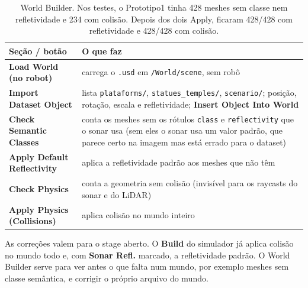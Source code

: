 \documentclass[10pt,a4paper]{article}
\newcommand{\arq}[1]{\texttt{#1}}
\newcommand{\botao}[1]{\textbf{#1}}
\begin{document}
\begin{table}[H]
\centering\small
\begin{tabularx}{\textwidth}{@{}lY@{}}
\toprule
Seção / botão & O que faz \\
\midrule
\botao{Load World (no robot)} & carrega o \arq{.usd} em \arq{/World/scene}, sem robô \\
\botao{Import Dataset Object} & lista \arq{plataforms/}, \arq{statues\_temples/}, \arq{scenario/}; posição, rotação, escala e
  refletividade; \botao{Insert Object Into World} \\
\botao{Check Semantic Classes} & conta os meshes sem os rótulos \texttt{class} e \texttt{reflectivity} que o sonar usa
  (sem eles o sonar usa um valor padrão, que parece certo na imagem mas está errado para o dataset) \\
\botao{Apply Default Reflectivity} & aplica a refletividade padrão aos meshes que não têm \\
\botao{Check Physics} & conta a geometria sem colisão (invisível para os raycasts do sonar e do LiDAR) \\
\botao{Apply Physics (Collisions)} & aplica colisão no mundo inteiro \\
\bottomrule
\end{tabularx}
\caption{World Builder. Nos testes, o Prototipo1 tinha 428 meshes sem classe nem refletividade e 234 com colisão. Depois
dos dois Apply, ficaram 428/428 com refletividade e 428/428 com colisão.}
\end{table}

As correções valem para o stage aberto. O \botao{Build} do simulador já aplica colisão no mundo todo e, com
\textbf{Sonar Refl.} marcado, a refletividade padrão. O World Builder serve para ver antes o que falta num mundo, por
exemplo meshes sem classe semântica, e corrigir o próprio arquivo do mundo.

\end{document}
